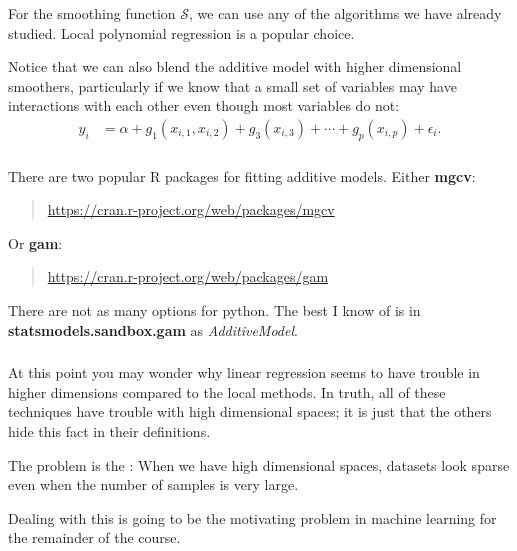 \documentclass[xetex,mathserif,serif,aspectratio=169]{beamer}
\begin{document}
\begin{frame}[fragile] \frametitle{} \oldB \small

\textbf{}

For the smoothing function $\mathcal{S}$, we can use any of the algorithms we have already
studied. Local polynomial regression is a popular choice.

\pause Notice that we can also blend the additive model with higher dimensional
smoothers, particularly if we know that a small set of variables may have interactions
with each other even though most variables do not:
\begin{align*}
y_i &= \alpha + g_1(x_{i,1},x_{i,2}) + g_3(x_{i,3}) +  \cdots + g_p(x_{i,p})  + \epsilon_i.
\end{align*}

\end{frame}

\begin{frame}[fragile] \frametitle{} \oldB \small

\textbf{}

There are two popular R packages for fitting additive
models. Either \textbf{mgcv}:
\begin{quote}
\url{https://cran.r-project.org/web/packages/mgcv}
\end{quote}
Or \textbf{gam}:
\begin{quote}
\url{https://cran.r-project.org/web/packages/gam}
\end{quote}

\pause There are not as many options for python. The best
I know of is in \textbf{statsmodels.sandbox.gam} as
\textit{AdditiveModel}.

\end{frame}

\begin{frame}[fragile] \frametitle{} \oldB \small

\textbf{}

At this point you may wonder why linear regression seems to have trouble
in higher dimensions compared to the local methods. In truth, all of
these techniques have trouble with high dimensional spaces; it is just
that the others hide this fact in their definitions.

\pause The problem is the : When we have
high dimensional spaces, datasets look sparse even when the number of samples
is very large.

\pause Dealing with this is going to be the motivating problem in machine
learning for the remainder of the course.

\end{frame}
\end{document}
